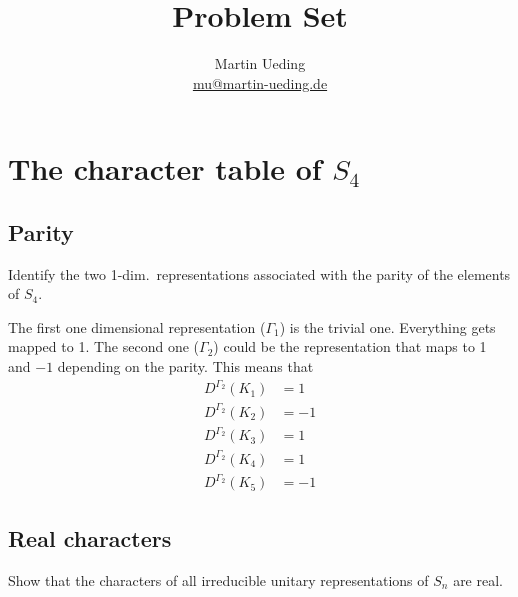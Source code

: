 \documentclass[11pt, english, fleqn, DIV=15, headinclude, BCOR=1cm]{scrartcl}
\title{Problem Set \arabic{problemset}}
\author{
    Martin Ueding \\ \small{\href{mailto:mu@martin-ueding.de}{mu@martin-ueding.de}}
}
\begin{document}
\maketitle

\section{The character table of $S_4$}

\subsection{Parity}

\begin{problem}
    Identify the two 1-dim.\ representations associated with the parity of the
    elements of $S_4$.
\end{problem}

The first one dimensional representation ($\Gamma_1$) is the trivial one.
Everything gets mapped to 1. The second one ($\Gamma_2$) could be the
representation that maps to 1 and $-1$ depending on the parity. This means that
\begin{align*}
    D^{\Gamma_2}(K_1)& = 1 \\
    D^{\Gamma_2}(K_2)& = -1 \\
    D^{\Gamma_2}(K_3)& = 1 \\
    D^{\Gamma_2}(K_4)& = 1 \\
    D^{\Gamma_2}(K_5)& = -1
\end{align*}

\subsection{Real characters}

\begin{problem}
    Show that the characters of all irreducible unitary representations of
    $S_n$ are real.
\end{problem}
\end{document}
